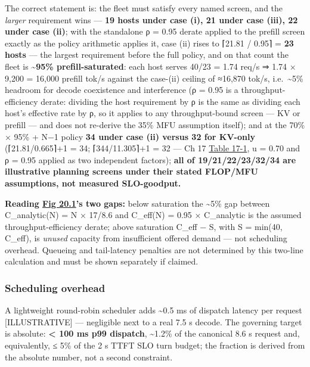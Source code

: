 The correct statement is: the fleet must satisfy every named screen, and
the \emph{larger} requirement wins --- \textbf{19 hosts under case (i),
21 under case (iii), 22 under case (ii)}; with the standalone ρ = 0.95
derate applied to the prefill screen exactly as the policy arithmetic
applies it, case (ii) rises to ⌈21.81 / 0.95⌉ = \textbf{23 hosts} ---
the largest requirement before the full policy, and on that count the
fleet is \textbf{\textasciitilde95\% prefill-saturated}: each host
serves 40/23 = 1.74 req/s ⇒ 1.74 × 9,200 = 16,000 prefill tok/s against
the case-(ii) ceiling of ≈16,870 tok/s, i.e.~\textasciitilde5\% headroom
for decode coexistence and interference (ρ = 0.95 is a
throughput-efficiency derate: dividing the host requirement by ρ is the
same as dividing each host's effective rate by ρ, so it applies to any
throughput-bound screen --- KV or prefill --- and does not re-derive the
35\% MFU assumption itself); and at the 70\% × 95\% + N−1 policy
\textbf{34 under case (ii) versus 32 for KV-only} (⌈21.81/0.665⌉+1 = 34;
⌈344/11.305⌉+1 = 32 --- Ch 17 \hyperref[tab:17.1]{Table 17-1}, u = 0.70 and ρ = 0.95 applied
as two independent factors); \textbf{all of 19/21/22/23/32/34 are
illustrative planning screens under their stated FLOP/MFU assumptions,
not measured SLO-goodput.}

\textbf{Reading \hyperref[fig:20.1]{Fig 20.1}'s two gaps:} below saturation the
\textasciitilde5\% gap between C\_analytic(N) = N × 17/8.6 and C\_eff(N)
= 0.95 × C\_analytic is the assumed throughput-efficiency derate; above
saturation C\_eff − S, with S = min(40, C\_eff), is \emph{unused}
capacity from insufficient offered demand --- not scheduling overhead.
Queueing and tail-latency penalties are not determined by this two-line
calculation and must be shown separately if claimed.

\subsubsection{Scheduling overhead}\label{scheduling-overhead}

A lightweight round-robin scheduler adds \textasciitilde0.5 ms of
dispatch latency per request \mbox{{[}ILLUSTRATIVE{]}} --- negligible next to a
real 7.5 s decode. The governing target is absolute: \textbf{\textless{}
100 ms p99 dispatch}, \textasciitilde1.2\% of the canonical 8.6 s
request and, equivalently, ≤ 5\% of the 2 s TTFT SLO turn budget; the
fraction is derived from the absolute number, not a second constraint.

